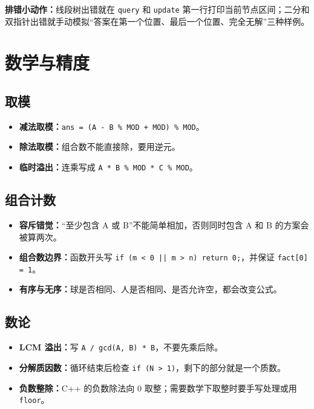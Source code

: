 \documentclass[UTF8,openany,oneside,zihao=-4]{ctexbook}
\newcommand{\note}[1]{%
  \vspace{0.35em}
  \noindent\colorbox{softblue}{%
    \parbox{\dimexpr\linewidth-2\fboxsep}{\textcolor{ink}{#1}}}%
  \vspace{0.35em}
}
\begin{document}
\note{\textbf{排错小动作：}线段树出错就在 \texttt{query} 和 \texttt{update} 第一行打印当前节点区间；二分和双指针出错就手动模拟“答案在第一个位置、最后一个位置、完全无解”三种样例。}

\section{数学与精度}

\subsection{取模}

\begin{itemize}
  \item \textbf{减法取模：}\texttt{ans = (A - B \% MOD + MOD) \% MOD}。
  \item \textbf{除法取模：}组合数不能直接除，要用逆元。
  \item \textbf{临时溢出：}连乘写成 \texttt{A * B \% MOD * C \% MOD}。
\end{itemize}

\subsection{组合计数}

\begin{itemize}
  \item \textbf{容斥错觉：}“至少包含 A 或 B”不能简单相加，否则同时包含 A 和 B 的方案会被算两次。
  \item \textbf{组合数边界：}函数开头写 \lstinline!if (m < 0 || m > n) return 0;!，并保证 \lstinline!fact[0] = 1!。
  \item \textbf{有序与无序：}球是否相同、人是否相同、是否允许空，都会改变公式。
\end{itemize}

\subsection{数论}

\begin{itemize}
  \item \textbf{LCM 溢出：}写 \lstinline!A / gcd(A, B) * B!，不要先乘后除。
  \item \textbf{分解质因数：}循环结束后检查 \lstinline!if (N > 1)!，剩下的部分就是一个质数。
  \item \textbf{负数整除：}C++ 的负数除法向 0 取整；需要数学下取整时要手写处理或用 \lstinline!floor!。
\end{itemize}
\end{document}
